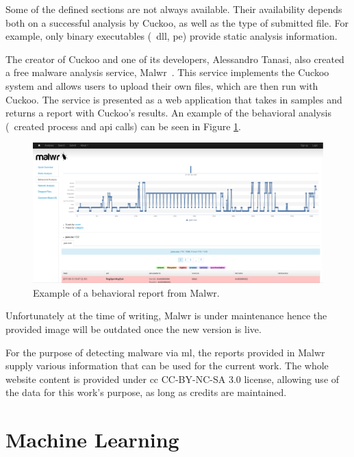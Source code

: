 Some of the defined sections are not always available.
Their availability depends both on a successful analysis by Cuckoo, as well as the type of submitted file.
For example, only binary executables (\eg\ \gls{dll}, \gls{pe}) provide static analysis information.

The creator of Cuckoo and one of its developers, Alessandro Tanasi, also created a free malware analysis service, Malwr~\cite{tool:malwr}.
This service implements the Cuckoo system and allows users to upload their own files, which are then run with Cuckoo.
The service is presented as a web application that takes in samples and returns a report with Cuckoo's results.
An example of the behavioral analysis (\ie\ created process and \gls{api} calls) can be seen in Figure \ref{fig:malwr_sample}.

\begin{figure}[!htb]
	\includegraphics[width=\columnwidth]{Figures/malwr_sample.png}
	\caption{Example of a behavioral report from Malwr.}
	\label{fig:malwr_sample}
\end{figure}

Unfortunately at the time of writing, Malwr is under maintenance hence the provided image will be outdated once the new version is live.

For the purpose of detecting malware via \gls{ml}, the reports provided in Malwr supply various information that can be used for the current work.
The whole website content is provided under \gls{cc} CC-BY-NC-SA 3.0\cite{cc-by-nc-sa} license, allowing use of the data for this work's purpose, as long as credits are maintained.

\section{Machine Learning}
\label{section:ml}

